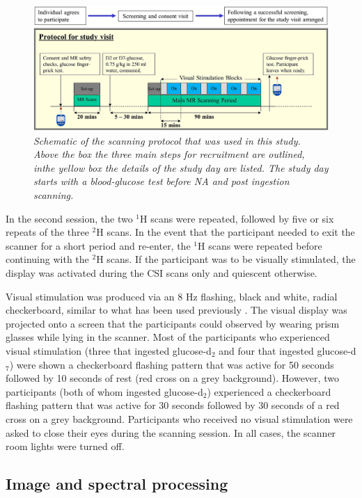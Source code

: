 \begin{figure}
    \centering
    \includegraphics[width = 1\textwidth]{Figures/Glucose/Protocol.png}
    \caption{\textit{Schematic of the scanning protocol that was used in this study. Above the box the three main steps for recruitment are outlined, inthe yellow box the details of the study day are listed. The study day starts with a blood-glucose test before \ac{NA} and post ingestion scanning.}}
    \label{fig:Glu:Protocol}
\end{figure}

In the second session, the two $^1$H scans were repeated, followed by five or six repeats of the three $^2$H scans. In the event that the participant needed to exit the scanner for a short period and re-enter, the $^1$H scans were repeated before continuing with the $^2$H scans. If the participant was to be visually stimulated, the display was activated during the \ac{CSI} scans only and quiescent otherwise.  

Visual stimulation was produced via an 8 Hz flashing, black and white, radial checkerboard, similar to what has been used previously \cite{Fernandes2020MeasurementT}. The visual display was projected onto a screen that the participants could observed by wearing prism glasses while lying in the scanner. Most of the participants who experienced visual stimulation (three that ingested glucose-d$_2$ and four that ingested glucose-d$_7$) were shown a checkerboard flashing pattern that was active for 50 seconds followed by 10 seconds of rest (red cross on a grey background). However, two participants (both of whom ingested glucose-d$_2$) experienced a checkerboard flashing pattern that was active for 30 seconds followed by 30 seconds of a red cross on a grey background. Participants who received no visual stimulation were asked to close their eyes during the scanning session. In all cases, the scanner room lights were turned off. 

\subsection{Image and spectral processing}

